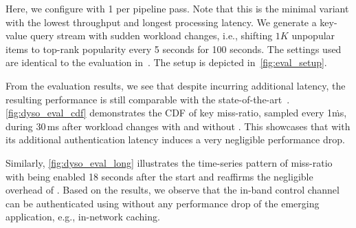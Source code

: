 





Here, we configure \sysname with 1 \pround per pipeline pass.
Note that this is the minimal variant with the lowest throughput and longest processing latency.
We generate a key-value query stream with sudden workload changes, i.e., shifting $1K$ unpopular items to top-rank popularity every 5 seconds for 100 seconds.
The settings used are identical to the evaluation in~\cite{dyso-p4}.
The setup is depicted in~\cref{fig:eval_setup}.

From the evaluation results, we see that despite \sysname incurring additional latency, the resulting performance is still comparable with the state-of-the-art~\cite{2023-ComputerNetworks-DySO}. 
\cref{fig:dyso_eval_cdf} demonstrates the CDF of key miss-ratio, sampled every 1\.ms, during 30\,ms after workload changes with and without \sysname.
This showcases that \sysname with its additional authentication latency induces a very negligible performance drop. 

Similarly, \cref{fig:dyso_eval_long} illustrates the time-series pattern of miss-ratio with \sysname being enabled 18 seconds after the start and reaffirms the negligible overhead of \sysname. 
Based on the results, we observe that the in-band control channel can be authenticated using \sysname without any performance drop of the emerging application, e.g., in-network caching.



